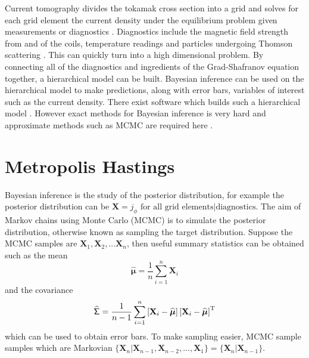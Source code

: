 \documentclass[10pt]{proc}
\newcommand{\T}{^\textup{T}}
\newcommand{\dotdotdot}{...}
\newcommand{\vectGreek}[1]{\boldsymbol{#1}}
\newcommand{\matr}[1]{\mathsf{#1}}
\begin{document}
Current tomography divides the tokamak cross section into a grid and solves for each grid element the current density under the equilibrium problem given measurements or diagnostics \citep{svensson2008current}. Diagnostics include the magnetic field strength from and of the coils, temperature readings and particles undergoing Thomson scattering \citep{svensson2004integrating} \citep{ford2009bayesian}. This can quickly turn into a high dimensional problem. By connecting all of the diagnostics and ingredients of the Grad-Shafranov equation together, a hierarchical model can be built. Bayesian inference can be used on the hierarchical model to make predictions, along with error bars, variables of interest such as the current density. There exist software which builds such a hierarchical model \citep{svensson2007large} \citep{svensson2008current} \citep{svensson2010connecting}. However exact methods for Bayesian inference is  very hard and approximate methods such as MCMC are required here \citep{ford2010tokamak}.

\section{Metropolis Hastings}
Bayesian inference is the study of the posterior distribution, for example the posterior distribution can be $\mathbf{X} = j_\phi\text{ for all grid elements}|\text{diagnostics}$. The aim of Markov chains using Monte Carlo (MCMC) is to simulate the posterior distribution, otherwise known as sampling the target distribution. Suppose the MCMC samples are $\mathbf{X}_1,\mathbf{X}_2,\dotdotdot\mathbf{X}_n$, then useful summary statistics can be obtained such as the mean
\begin{equation}
\widehat{\vectGreek{\mu}} = \dfrac{1}{n}\sum_{i=1}^n \mathbf{X}_i
\end{equation}
and the covariance
\begin{equation}
\widehat{\matr{\Sigma}} = \dfrac{1}{n-1}\sum_{i=1}^n \left[\mathbf{X}_i-\widehat{\vectGreek{\mu}}\right]
\left[\mathbf{X}_i-\widehat{\vectGreek{\mu}}\right]\T
\end{equation}
which can be used to obtain error bars. To make sampling easier, MCMC sample samples which are Markovian $\{\mathbf{X}_n|\mathbf{X}_{n-1},\mathbf{X}_{n-2},\dotdotdot,\mathbf{X}_{1}\} = \{\mathbf{X}_n|\mathbf{X}_{n-1}\}$.
\end{document}
